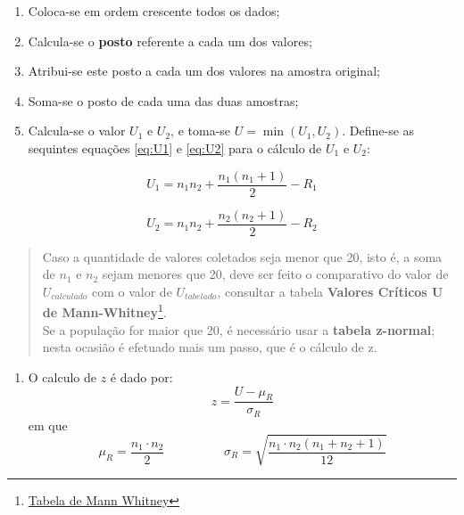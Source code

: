 \documentclass[
]{book}
\providecommand{\tightlist}{%
  \setlength{\itemsep}{0pt}\setlength{\parskip}{0pt}}
\begin{document}
\begin{enumerate}
\def\labelenumi{\arabic{enumi}.}
\tightlist
\item
  Coloca-se em ordem crescente todos os dados;
\item
  Calcula-se o \textbf{posto} referente a cada um dos valores;
\item
  Atribui-se este posto a cada um dos valores na amostra original;
\item
  Soma-se o posto de cada uma das duas amostras;
\item
  Calcula-se o valor \(U_1\) e \(U_2\), e toma-se \(U = \min(U_1,U_2)\). Define-se as sequintes equações \eqref{eq:U1} e \eqref{eq:U2} para o cálculo de \(U_1\) e \(U_2\):
\end{enumerate}

\begin{equation}
  U_1 = n_1 n_2 + \frac{n_1(n_1+1)}{2} - R_1 
  \label{eq:U1}
\end{equation}

\begin{equation}
U_2 = n_1 n_2 + \frac{n_2(n_2+1)}{2} - R_2
\label{eq:U2}
\end{equation}

\begin{quote}
Caso a quantidade de valores coletados seja menor que 20, isto é, a soma de \(n_1\) e \(n_2\) sejam menores que 20, deve ser feito o comparativo do valor de \(U_{calculado}\) com o valor de \(U_{tabelado}\), consultar a tabela \textbf{Valores Críticos U de Mann-Whitney}\footnote{\href{https://ocw.umb.edu/psychology/psych-270/other-materials/RelativeResourceManager.pdf}{Tabela de Mann Whitney}}.\\
Se a população for maior que 20, é necessário usar a \textbf{tabela z-normal}; nesta ocasião é efetuado mais um passo, que é o cálculo de z.
\end{quote}

\begin{enumerate}
\def\labelenumi{\arabic{enumi}.}
\setcounter{enumi}{5}
\tightlist
\item
  O calculo de \(z\) é dado por:
  \begin{equation}
  z = \frac{U - \mu_R}{\sigma_R}
  \label{eq:zMannWhitney}
  \end{equation}
  em que
  \[ 
  \mu_R = \frac{n_1 \cdot n_2}{2} \hspace{2cm} \sigma_R = \sqrt{\frac{n_1 \cdot n_2(n_1 + n_2 + 1)}{12}}
  \]
\end{enumerate}
\end{document}
